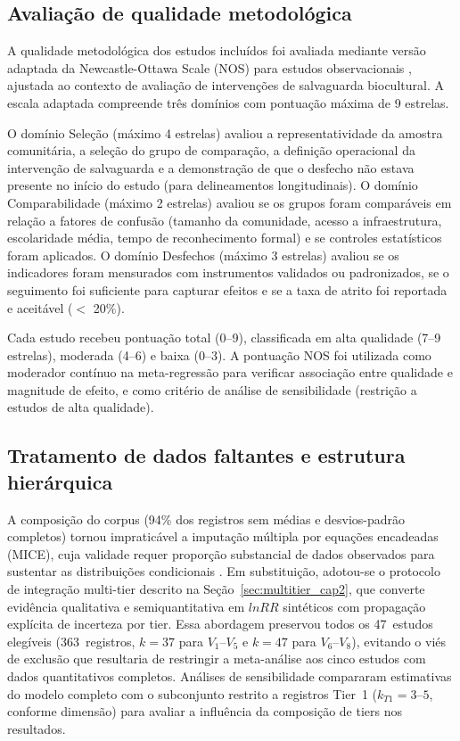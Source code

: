 \subsection{Avaliação de qualidade metodológica}
\label{sec:nos_cap2}

A qualidade metodológica dos estudos incluídos foi avaliada mediante versão adaptada da Newcastle-Ottawa Scale (NOS) para estudos observacionais \cite{Wells2000}, ajustada ao contexto de avaliação de intervenções de salvaguarda biocultural. A escala adaptada compreende três domínios com pontuação máxima de 9 estrelas.

O domínio Seleção (máximo 4 estrelas) avaliou a representatividade da amostra comunitária, a seleção do grupo de comparação, a definição operacional da intervenção de salvaguarda e a demonstração de que o desfecho não estava presente no início do estudo (para delineamentos longitudinais). O domínio Comparabilidade (máximo 2 estrelas) avaliou se os grupos foram comparáveis em relação a fatores de confusão (tamanho da comunidade, acesso a infraestrutura, escolaridade média, tempo de reconhecimento formal) e se controles estatísticos foram aplicados. O domínio Desfechos (máximo 3 estrelas) avaliou se os indicadores foram mensurados com instrumentos validados ou padronizados, se o seguimento foi suficiente para capturar efeitos e se a taxa de atrito foi reportada e aceitável ($<$ 20\%).

Cada estudo recebeu pontuação total (0--9), classificada em alta qualidade (7--9 estrelas), moderada (4--6) e baixa (0--3). A pontuação NOS foi utilizada como moderador contínuo na meta-regressão para verificar associação entre qualidade e magnitude de efeito, e como critério de análise de sensibilidade (restrição a estudos de alta qualidade).

\subsection{Tratamento de dados faltantes e estrutura hierárquica}
\label{sec:missing_cap2}

A composição do corpus (94\% dos registros sem médias e desvios-padrão completos) tornou impraticável a imputação múltipla por equações encadeadas (MICE), cuja validade requer proporção substancial de dados observados para sustentar as distribuições condicionais \cite{vanBuuren2011}. Em substituição, adotou-se o protocolo de integração multi-tier descrito na Seção~\ref{sec:multitier_cap2}, que converte evidência qualitativa e semiquantitativa em $lnRR$ sintéticos com propagação explícita de incerteza por tier. Essa abordagem preservou todos os 47~estudos elegíveis (363~registros, $k = 37$ para $V_1$--$V_5$ e $k = 47$ para $V_6$--$V_8$), evitando o viés de exclusão que resultaria de restringir a meta-análise aos cinco estudos com dados quantitativos completos. Análises de sensibilidade compararam estimativas do modelo completo com o subconjunto restrito a registros Tier~1 ($k_{T1} = 3\text{--}5$, conforme dimensão) para avaliar a influência da composição de tiers nos resultados.

